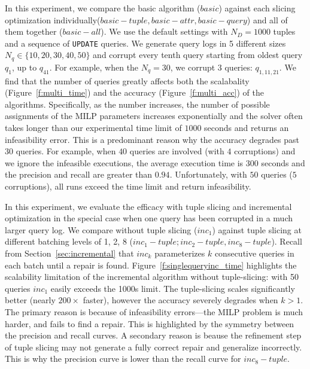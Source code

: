 In this experiment, we compare the basic algorithm ($basic$) against 
each slicing optimization individually($basic-tuple, basic-attr, basic-query$) and all of them together ($basic-all$).  
We use the default settings with $N_D = 1000$ tuples and a sequence of \texttt{UPDATE} queries.
We generate query logs in 5 different sizes $N_q\in \{10, 20, 30, 40, 50\}$ and corrupt 
every tenth query starting from oldest query $q_1$,
up to $q_{41}$.  For example, when the $N_q = {30}$, we corrupt 3 queries: $q_{1,11,21}$. 
We find that the number of queries greatly affects both the scalabality (Figure~\ref{f:multi_time}) 
and the accuracy (Figure~\ref{f:multi_acc}) of the algorithms. Specifically, as the number increases,
the number of possible assignments of the MILP parameters increases exponentially and the solver often takes
longer than our experimental time limit of $1000$ seconds and returns an infeasibility error.  
This is a predominant reason why the accuracy degrades past $30$ queries.  For example, 
when $40$ queries are involved (with $4$ corruptions) 
and we ignore the infeasible executions, the average execution time is $300$ seconds
and the precision and recall are greater than $0.94$.  Unfortunately, with $50$ queries ($5$ corruptions),
all runs exceed the time limit and return infeasibility.

In this experiment, we evaluate the efficacy \sys with tuple slicing and incremental optimization
in the special case when one query has been corrupted in a much larger query log. 
We compare \incremental without tuple slicing ($inc_1$) against tuple slicing at 
different batching levels of 1, 2, 8 ($inc_1-tuple; inc_2-tuple, inc_8-tuple$). 
Recall from Section~\ref{sec:incremental} that $inc_k$ parameterizes $k$ consecutive queries in each batch until a repair is found.
Figure~\ref{f:singlequeryinc_time} highlights the scalability limitation of the incremental 
algorithm without tuple-slicing: with 50 queries $inc_1$  easily exceeds the 1000s limit.   
The tuple-slicing scales significantly better (nearly $200\times$ faster), however
the accuracy severely degrades when $k>1$.  
The primary reason is because of infeasibility errors---the MILP problem is much harder, and fails to find a repair.  
This is highlighted by the symmetry between the precision and recall curves.  
A secondary reason is beause the refinement step of  tuple slicing may not generate a fully correct repair and generalize incorrectly.
This is why the precision curve is lower than the recall curve for $inc_8-tuple$.




